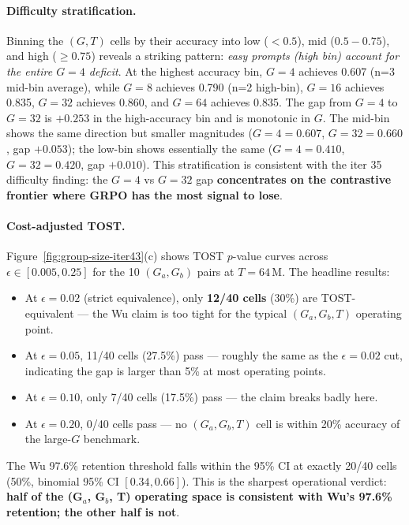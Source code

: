 \paragraph{Difficulty stratification.}
Binning the $(G, T)$ cells by their accuracy into low ($<0.5$),
mid ($0.5{-}0.75$), and high ($\geq 0.75$) reveals a striking pattern:
\emph{easy prompts (high bin) account for the entire $G{=}4$ deficit}.
At the highest accuracy bin, $G{=}4$ achieves 0.607 (n=3 mid-bin
average), while $G{=}8$ achieves 0.790 (n=2 high-bin), $G{=}16$
achieves 0.835, $G{=}32$ achieves 0.860, and $G{=}64$ achieves
0.835. The gap from $G{=}4$ to $G{=}32$ is $+0.253$ in the
high-accuracy bin and is monotonic in $G$. The mid-bin shows the
same direction but smaller magnitudes ($G{=}4 = 0.607$, $G{=}32 = 0.660$,
gap $+0.053$); the low-bin shows essentially the same ($G{=}4 = 0.410$,
$G{=}32 = 0.420$, gap $+0.010$). This stratification is consistent
with the iter 35 difficulty finding: the $G{=}4$ vs $G{=}32$ gap
\textbf{concentrates on the contrastive frontier where GRPO has the
most signal to lose}.

\paragraph{Cost-adjusted TOST.}
Figure~\ref{fig:group-size-iter43}(c) shows TOST $p$-value curves
across $\epsilon \in [0.005, 0.25]$ for the 10 $(G_a, G_b)$ pairs at
$T{=}64$\,M. The headline results:
\begin{itemize}
  \item At $\epsilon{=}0.02$ (strict equivalence), only \textbf{12/40
        cells} (30\%) are TOST-equivalent --- the Wu claim is too
        tight for the typical $(G_a, G_b, T)$ operating point.
  \item At $\epsilon{=}0.05$, 11/40 cells (27.5\%) pass --- roughly the
        same as the $\epsilon{=}0.02$ cut, indicating the gap is
        larger than 5\% at most operating points.
  \item At $\epsilon{=}0.10$, only 7/40 cells (17.5\%) pass --- the
        claim breaks badly here.
  \item At $\epsilon{=}0.20$, 0/40 cells pass --- no $(G_a, G_b, T)$
        cell is within 20\% accuracy of the large-$G$ benchmark.
\end{itemize}
The Wu 97.6\% retention threshold falls within the 95\% CI at exactly
20/40 cells (50\%, binomial 95\% CI $[0.34, 0.66]$). This is the
sharpest operational verdict: \textbf{half of the (G$_a$, G$_b$, T)
operating space is consistent with Wu's 97.6\% retention; the other
half is not}.

